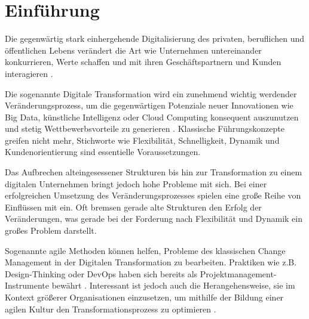 \chapter{Einführung}
\label{introduction}

Die gegenwärtig stark einhergehende Digitalisierung des privaten, beruflichen und öffentlichen Lebens verändert die Art wie Unternehmen untereinander konkurrieren, Werte schaffen und mit ihren Geschäftspartnern und Kunden interagieren \cite[S. 1]{oswald_digitale_2018}.

Die sogenannte Digitale Transformation wird ein zunehmend wichtig werdender Veränderungsprozess, um die gegenwärtigen Potenziale neuer Innovationen wie Big Data, künstliche Intelligenz oder Cloud Computing konsequent auszunutzen und stetig Wettbewerbsvorteile zu generieren \cite[S. 2]{oswald_digitale_2018}. Klassische Führungskonzepte greifen nicht mehr, Stichworte wie Flexibilität, Schnelligkeit, Dynamik und Kundenorientierung sind essentielle Voraussetzungen. 

Das Aufbrechen alteingesessener Strukturen bis hin zur Transformation zu einem digitalen Unternehmen bringt jedoch hohe Probleme mit sich. Bei einer erfolgreichen Umsetzung des Veränderungsprozesses spielen eine große Reihe von Einflüssen mit ein. Oft bremsen gerade alte Strukturen den Erfolg der Veränderungen, was gerade bei der Forderung nach Flexibilität und Dynamik ein großes Problem darstellt. \cite[S. 196]{appelfeller_digitale_2018} 

Sogenannte agile Methoden können helfen, Probleme des klassischen Change Management in der Digitalen Transformation zu bearbeiten. Praktiken wie z.B. Design-Thinking oder DevOps haben sich bereits als Projektmanagement-Instrumente bewährt \cite[S. 7]{deeken_agiles_2018}. Interessant ist jedoch auch die Herangehensweise, sie im Kontext größerer Organisationen einzusetzen, um mithilfe der Bildung einer agilen Kultur den Transformationsprozess zu optimieren \cite[S. 140]{hofert_agiler_2016}.

